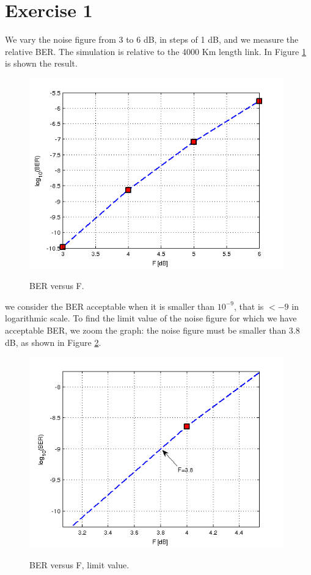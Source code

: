 \documentclass[a4paper,10pt]{report}
\begin{document}
 
 
 
 \newpage
\section*{Exercise 1}
We vary the noise figure from 3 to 6 dB, in steps of 1 dB, and we measure the relative BER. The simulation is relative to the 4000 Km length link.
In Figure \ref{es1} is shown the result.

 \begin{figure}[!ht]
   \centering
   \includegraphics[width=11cm]{es1.png}\\
   \caption{BER versus F.}
   \label{es1}
 \end{figure}

we consider the BER acceptable when it is smaller than $10^{-9}$, that is $< -9$ in logarithmic scale.
To find the limit value of the noise figure for which we have acceptable BER, we zoom the graph: the noise figure must be smaller than
3.8 dB, as shown in Figure \ref{es1_2}.

\begin{figure}[!ht]
   \centering
   \includegraphics[width=11cm]{es1_2.png}\\
   \caption{BER versus F, limit value.}
   \label{es1_2}
 \end{figure}
\end{document}

